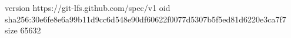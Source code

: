 version https://git-lfs.github.com/spec/v1
oid sha256:30e6fe8e6a99b11d9cc6d548e90df60622f0077d5307b5f5ed81d6220e3ca7f7
size 65632
